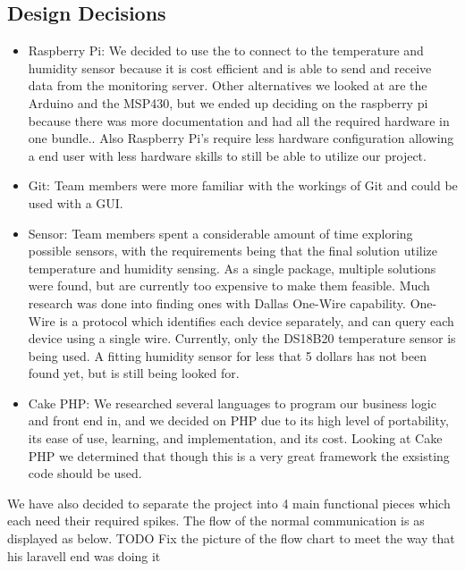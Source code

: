 \documentclass{report}
\begin{document}
\subsection*{Design Decisions}
\begin{itemize}
\item Raspberry Pi: We decided to use the to connect to the temperature and humidity sensor because it is cost efficient and is able to send and receive data from the monitoring server. Other alternatives we looked at are the Arduino and the MSP430, but we ended up deciding on the raspberry pi because there was more documentation and had all the required hardware in one bundle.. Also Raspberry Pi’s require less hardware configuration allowing a end user with less hardware skills to still be able to utilize our project.
\item Git: Team members were more familiar with the workings of Git and could be used with a GUI.
\item Sensor: Team members spent a considerable amount of time exploring possible sensors, with the requirements being that the final solution utilize temperature and humidity sensing. As a single package, multiple solutions were found, but are currently too expensive to make them feasible. Much research was done into finding ones with Dallas One-Wire capability. One-Wire is a protocol which identifies each device separately, and can query each device using a single wire. Currently, only the DS18B20 temperature sensor is being used. A fitting humidity sensor for less that 5 dollars has not been found yet, but is still being looked for.
\item Cake PHP: We researched several languages to program our business logic and front end in, and we decided on PHP due to its high level of portability, its ease of use, learning, and implementation, and its cost. Looking at Cake PHP we determined that though this is a very great framework the exsisting code should be used.
\end{itemize}
We have also decided to separate the project into 4 main functional pieces which each need their required spikes. The flow of the normal communication is as displayed as below.
TODO Fix the picture of the flow chart to meet the way that his laravell end was doing it
\newpage
\end{document}
